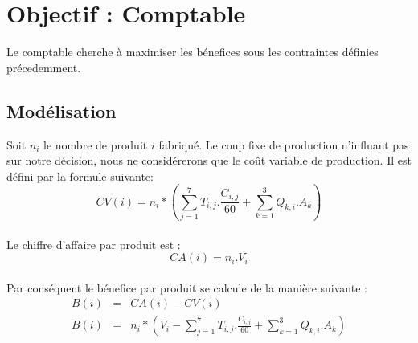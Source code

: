 \newpage
\section{Objectif : Comptable}
Le comptable cherche à maximiser les bénefices sous les contraintes définies
précedemment.

\subsection{Modélisation}
Soit $n_i$ le nombre de produit $i$ fabriqué. Le coup fixe de production
n'influant pas sur notre décision, nous ne considérerons que le coût variable de
production. Il est défini par la formule suivante:
\begin{displaymath}
CV(i) = n_i * \left (\sum_{j = 1}^{7} T_{i,j} .
\frac{C_{i,j}}{60} + \sum_{k = 1}^{3} Q_{k,i} . A_{k} \right )
\end{displaymath}
~\\
Le chiffre d'affaire par produit est :
\begin{displaymath}
CA(i) = n_i . V_i
\end{displaymath}
~\\
Par conséquent le bénefice par produit se calcule de la manière suivante :
\begin{eqnarray*}
	B(i) &=& CA(i) - CV(i)\\
	B(i) &=& n_i * \left (V_i - \sum_{j = 1}^{7} T_{i,j} . \frac{C_{i,j}}{60} +
	\sum_{k = 1}^{3} Q_{k,i} . A_{k} \right )
\end{eqnarray*}